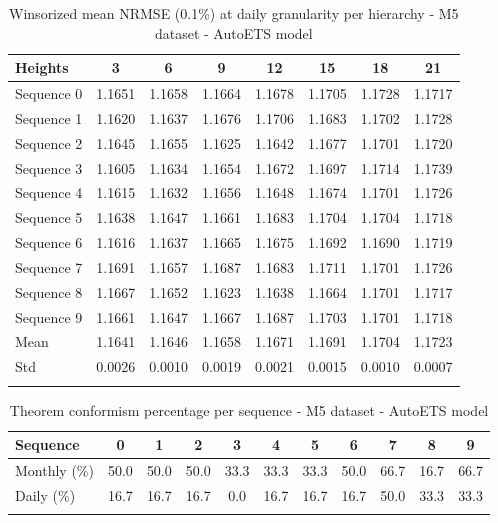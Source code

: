 \begin{table}[h]
\caption{Winsorized mean NRMSE (0.1\%) at daily granularity per hierarchy - M5 dataset - AutoETS model}\label{tab:day_mean_M5_AutoETS}
\begin{tabular*}{\textwidth}{@{\extracolsep\fill}lccccccc}
\toprule
Heights & 3 & 6 & 9 & 12 & 15 & 18 & 21 \\
\midrule
Sequence 0 & 1.1651 & 1.1658 & 1.1664 & 1.1678 & 1.1705 & 1.1728 & 1.1717 \\
Sequence 1 & 1.1620 & 1.1637 & 1.1676 & 1.1706 & 1.1683 & 1.1702 & 1.1728 \\
Sequence 2 & 1.1645 & 1.1655 & 1.1625 & 1.1642 & 1.1677 & 1.1701 & 1.1720 \\
Sequence 3 & 1.1605 & 1.1634 & 1.1654 & 1.1672 & 1.1697 & 1.1714 & 1.1739 \\
Sequence 4 & 1.1615 & 1.1632 & 1.1656 & 1.1648 & 1.1674 & 1.1701 & 1.1726 \\
Sequence 5 & 1.1638 & 1.1647 & 1.1661 & 1.1683 & 1.1704 & 1.1704 & 1.1718 \\
Sequence 6 & 1.1616 & 1.1637 & 1.1665 & 1.1675 & 1.1692 & 1.1690 & 1.1719 \\
Sequence 7 & 1.1691 & 1.1657 & 1.1687 & 1.1683 & 1.1711 & 1.1701 & 1.1726 \\
Sequence 8 & 1.1667 & 1.1652 & 1.1623 & 1.1638 & 1.1664 & 1.1701 & 1.1717 \\
Sequence 9 & 1.1661 & 1.1647 & 1.1667 & 1.1687 & 1.1703 & 1.1701 & 1.1718 \\
\midrule
Mean & 1.1641 & 1.1646 & 1.1658 & 1.1671 & 1.1691 & 1.1704 & 1.1723 \\
Std & 0.0026 & 0.0010 & 0.0019 & 0.0021 & 0.0015 & 0.0010 & 0.0007 \\
\botrule
\end{tabular*}
\end{table}

\begin{table}[h]
\caption{Theorem conformism percentage per sequence - M5 dataset - AutoETS model}\label{tab:conformism_M5_AutoETS}
\begin{tabular*}{\textwidth}{@{\extracolsep\fill}lcccccccccc}
\toprule
Sequence & 0 & 1 & 2 & 3 & 4 & 5 & 6 & 7 & 8 & 9 \\
\midrule
Monthly (\%) & 50.0 & 50.0 & 50.0 & 33.3 & 33.3 & 33.3 & 50.0 & 66.7 & 16.7 & 66.7 \\
Daily (\%) & 16.7 & 16.7 & 16.7 & 0.0 & 16.7 & 16.7 & 16.7 & 50.0 & 33.3 & 33.3 \\
\botrule
\end{tabular*}
\end{table}


